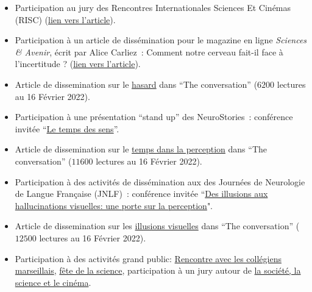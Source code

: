 \documentclass[10pt,french,a4paper,oneside]{article}%
\newcommand{\years}[1]{\marginpar{\textit{\scriptsize #1}}}
\begin{document}
\begin{itemize}
    \item Participation au jury des \og Rencontres Internationales Sciences Et Cinémas (RISC) \fg{} (\href{https://laurentperrinet.github.io/post/2023-12-16-risc/}{lien vers l'article}).

    \item Participation à un article de dissémination pour le magazine en ligne \textit{Sciences \& Avenir}, écrit par Alice Carliez~: \og Comment notre cerveau fait-il face à l’incertitude ? \fg{} (\href{https://laurentperrinet.github.io/post/2023-07-26-epsiloon/}{lien vers l'article}).

	\item Article de dissemination sur le \href{https://laurentperrinet.github.io/publication/perrinet-21-hasard/}{hasard} dans ``The conversation'' ($6200$ lectures au 16 Février 2022). \years{2022}

	\item Participation à une présentation ``stand up'' des NeuroStories~: conférence invitée  ``\href{https://laurentperrinet.github.io/post/2019-10-07_neurostories/}{Le temps des sens}''. \years{2019}

	\item Article de dissemination sur le \href{https://laurentperrinet.github.io/publication/perrinet-19-temps/}{temps dans la perception} dans ``The conversation'' ($11600$ lectures au 16 Février 2022).

	\item Participation à des activités de dissémination aux des Journées de Neurologie de Langue Française (JNLF)~: conférence invitée  ``\href{https://laurentperrinet.github.io/talk/2019-04-18-jnlf/}{Des illusions aux hallucinations visuelles: une porte sur la perception}".

	\item Article de dissemination sur les \href{https://theconversation.com/illusions-et-hallucinations-visuelles-une-porte-sur-la-perception-117389}{illusions visuelles} dans ``The conversation'' ($12500$ lectures au 16 Février 2022). \years{2018}

	\item Participation à des activités grand public: \href{https://laurentperrinet.github.io/talk/2019-01-10-polly-maggoo/}{Rencontre avec les collégiens marseillais}, \href{https://laurentperrinet.github.io/talk/2018-10-10-polly-maggoo/}{fête de la science}, participation à un jury autour de \href{https://laurentperrinet.github.io/talk/2017-11-17-festival-interferences/}{la société, la science et le cinéma}.


\end{itemize}
\end{document}
